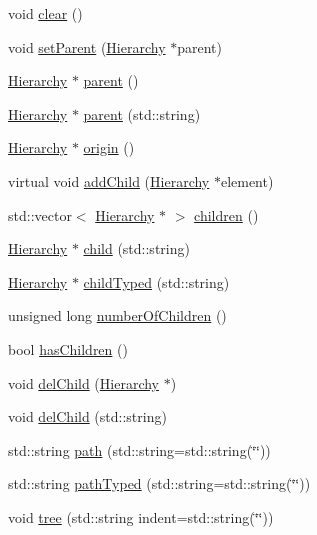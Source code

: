 \begin{DoxyCompactItemize}
\item 
void \hyperlink{classHierarchy_af4d43b0765b402670eed2d62c73405af}{clear} ()
\item 
void \hyperlink{classHierarchy_a585ad1aeec16077a0e532ab8b4fc557b}{setParent} (\hyperlink{classHierarchy}{Hierarchy} $\ast$parent)
\item 
\hyperlink{classHierarchy}{Hierarchy} $\ast$ \hyperlink{classHierarchy_a1c7bec8257e717f9c1465e06ebf845fc}{parent} ()
\item 
\hyperlink{classHierarchy}{Hierarchy} $\ast$ \hyperlink{classHierarchy_ad550588733bf75ac5c0fcfd7c8fd11a6}{parent} (std::string)
\item 
\hyperlink{classHierarchy}{Hierarchy} $\ast$ \hyperlink{classHierarchy_aee461dc930ce3871636ff87f075b1b83}{origin} ()
\item 
virtual void \hyperlink{classHierarchy_ad677774ff38fcb257c04a3a10d471fac}{addChild} (\hyperlink{classHierarchy}{Hierarchy} $\ast$element)
\item 
std::vector$<$ \hyperlink{classHierarchy}{Hierarchy} $\ast$ $>$ \hyperlink{classHierarchy_aa9a76f69e98e052ee1a6e32cea006288}{children} ()
\item 
\hyperlink{classHierarchy}{Hierarchy} $\ast$ \hyperlink{classHierarchy_a1e207f973c694b538bf90107b4868817}{child} (std::string)
\item 
\hyperlink{classHierarchy}{Hierarchy} $\ast$ \hyperlink{classHierarchy_a0c15a5276a3b80b4354d6bd8a01e0708}{childTyped} (std::string)
\item 
unsigned long \hyperlink{classHierarchy_ab16e84de65fd84e14001a6cf941c8be4}{numberOfChildren} ()
\item 
bool \hyperlink{classHierarchy_a255174fe4d316d2a3f430dcb9dab29f1}{hasChildren} ()
\item 
void \hyperlink{classHierarchy_a2b2b359fac003233f65786a616766bde}{delChild} (\hyperlink{classHierarchy}{Hierarchy} $\ast$)
\item 
void \hyperlink{classHierarchy_a1928ac7615fe0b5e55cd707f70dc6781}{delChild} (std::string)
\item 
std::string \hyperlink{classHierarchy_aa7990fa7caf132d83e361ce033c6c65a}{path} (std::string=std::string(\char`\"{}\char`\"{}))
\item 
std::string \hyperlink{classHierarchy_a1efd56cd164d328d2002e53a10a19b8c}{pathTyped} (std::string=std::string(\char`\"{}\char`\"{}))
\item 
void \hyperlink{classHierarchy_a76e914b9a677a22a82deb74d892bf261}{tree} (std::string indent=std::string(\char`\"{}\char`\"{}))

\end{DoxyCompactItemize}
